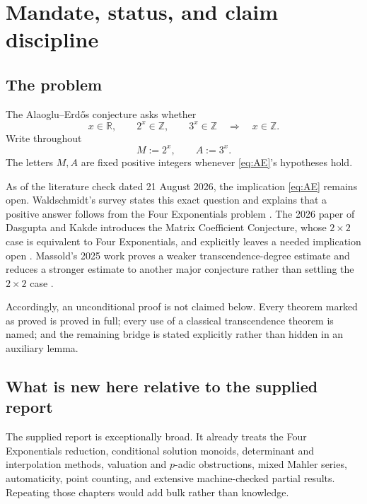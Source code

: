 \documentclass[11pt,oneside]{article}
\theoremstyle{definition}
\theoremstyle{remark}
\newcommand{\Z}{\mathbb Z}
\newcommand{\R}{\mathbb R}
\newcommand{\AEconj}{Alaoglu--Erd\H{o}s}
\begin{document}
\tableofcontents
\clearpage
{}

\section{Mandate, status, and claim discipline}

\subsection{The problem}

The \AEconj{} conjecture asks whether
\begin{equation}
  x\in\R,\qquad 2^x\in\Z,\qquad 3^x\in\Z
  \quad\Longrightarrow\quad x\in\Z.
  \label{eq:AE}
\end{equation}
Write throughout
\begin{equation}
  M:=2^x,\qquad A:=3^x.
  \label{eq:MA}
\end{equation}
The letters \(M,A\) are fixed positive integers whenever \eqref{eq:AE}'s hypotheses hold.

\begin{verdictbox}
As of the literature check dated 21 August 2026, the implication \eqref{eq:AE} remains open.  Waldschmidt's survey states this exact question and explains that a positive answer follows from the Four Exponentials problem \cite{Waldschmidt2023}.  The 2026 paper of Dasgupta and Kakde introduces the Matrix Coefficient Conjecture, whose \(2\times2\) case is equivalent to Four Exponentials, and explicitly leaves a needed implication open \cite{DasguptaKakde2026}.  Massold's 2025 work proves a weaker transcendence-degree estimate and reduces a stronger estimate to another major conjecture rather than settling the \(2\times2\) case \cite{Massold2025}.

Accordingly, an unconditional proof is not claimed below.  Every theorem marked as proved is proved in full; every use of a classical transcendence theorem is named; and the remaining bridge is stated explicitly rather than hidden in an auxiliary lemma.
\end{verdictbox}

\subsection{What is new here relative to the supplied report}

The supplied report is exceptionally broad.  It already treats the Four Exponentials reduction, conditional solution monoids, determinant and interpolation methods, valuation and \(p\)-adic obstructions, mixed Mahler series, automaticity, point counting, and extensive machine-checked partial results.  Repeating those chapters would add bulk rather than knowledge.
\end{document}
